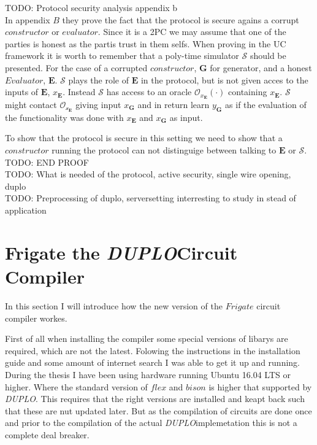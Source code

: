 \documentclass[twoside,11pt,openright]{report}
\newcommand{\todo}[1]{}
\renewcommand{\todo}[1]{{\color{red} TODO: {#1}} \\}
\newcommand{\DUPLO}{\textit{DUPLO}}
\begin{document}
\todo{Protocol security analysis appendix b}
In appendix $B$ they prove the fact that the protocol is secure agains a corrupt $constructor$ or $evaluator$. Since it is a 2PC we may assume that one of the parties is honest as the partis trust in them selfs. When proving in the UC framework it is worth to remember that a poly-time simulator $\mathcal{S}$ should be presented. For the case of a corrupted $constructor$, $\mathbf{G}$ for generator, and a honest $Evaluator$, $\mathbf{E}$. $\mathcal{S}$ plays the role of $\mathbf{E}$ in the protocol, but is not given acces to the inputs of $\mathbf{E}$, $x_{\mathbf{E}}$. Instead $\mathcal{S}$ has access to an oracle $\mathcal{O}_{x_{\mathbf{E}}}(\cdot)$ containing $x_{\mathbf{E}}$. $\mathcal{S}$ might contact $\mathcal{O_{x_{\mathbf{E}}}}$ giving input $x_{\mathbf{G}}$ and in return learn $y_{\mathbf{G}}$ as if the evaluation of the functionality was done with $x_{\mathbf{E}}$ and $x_{\mathbf{G}}$ as input.

To show that the protocol is secure in this setting we need to show that a $constructor$ running the protocol can not distinguige between talking to $\mathbf{E}$ or $\mathcal{S}$. \todo{END PROOF}

\todo{What is needed of the protocol, active security, single wire opening, duplo}

\todo{Preprocessing of duplo, serversetting interresting to study in stead of application}

\section{Frigate the \DUPLO Circuit Compiler}
\label{sec:frigate}
In this section I will introduce how the new version of the $Frigate$ circuit compiler workes.

First of all when installing the compiler some special versions of libarys are required, which are not the latest. Folowing the instructions in the installation guide and some amount of internet search I was able to get it up and running. During the thesis I have been using hardware running Ubuntu 16.04 LTS or higher. Where the standard version of $flex$ and $bison$ is higher that supported by \DUPLO. This requires that the right versions are installed and keapt back such that these are nut updated later. But as the compilation of circuits are done once and prior to the compilation of the actual \DUPLO implemetation this is not a complete deal breaker.
\end{document}
